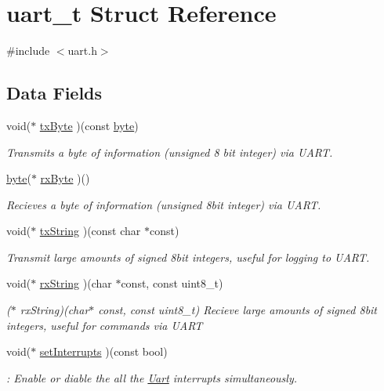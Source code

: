 \hypertarget{a00010}{\section{uart\-\_\-t Struct Reference}
\label{a00010}
}


{\ttfamily \#include $<$uart.\-h$>$}

\subsection*{Data Fields}
\begin{DoxyCompactItemize}
\item 
void($\ast$ \hyperlink{a00018_ga2ee9c992930c7a52010c7a6abf0d316c}{tx\-Byte} )(const \hyperlink{a00011_a82b52bf2b45e214a8f2100ebfdf1aee4}{byte})
\begin{DoxyCompactList}\small\item\em Transmits a byte of information (unsigned 8 bit integer) via U\-A\-R\-T. \end{DoxyCompactList}\item 
\hyperlink{a00011_a82b52bf2b45e214a8f2100ebfdf1aee4}{byte}($\ast$ \hyperlink{a00018_ga114e9fef74ba99e9a09f89ed6d12da17}{rx\-Byte} )()
\begin{DoxyCompactList}\small\item\em Recieves a byte of information (unsigned 8bit integer) via U\-A\-R\-T. \end{DoxyCompactList}\item 
void($\ast$ \hyperlink{a00018_gaced0693da5d9c07328e6a325d6d7edee}{tx\-String} )(const char $\ast$const)
\begin{DoxyCompactList}\small\item\em Transmit large amounts of signed 8bit integers, useful for logging to U\-A\-R\-T. \end{DoxyCompactList}\item 
void($\ast$ \hyperlink{a00018_gafb6340cda56aa27bc772e4ceec334c82}{rx\-String} )(char $\ast$const, const uint8\-\_\-t)
\begin{DoxyCompactList}\small\item\em ($\ast$ rx\-String)(char$\ast$ const, const uint8\-\_\-t) Recieve large amounts of signed 8bit integers, useful for commands via U\-A\-R\-T \end{DoxyCompactList}\item 
void($\ast$ \hyperlink{a00018_gac87718fed4c53bd319218fe925e52d14}{set\-Interrupts} )(const bool)
\begin{DoxyCompactList}\small\item\em \-: Enable or diable the all the \hyperlink{a00009}{Uart} interrupts simultaneously. \end{DoxyCompactList}\item 

\end{DoxyCompactItemize}

